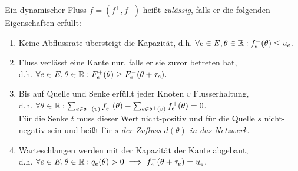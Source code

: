 \begin{definition}
	Ein dynamischer Fluss $f=(f^+, f^-)$ heißt \emph{zulässig}, falls er die folgenden Eigenschaften erfüllt:
	\begin{enumerate}[label=(F\arabic*)]
		\item\label{def-feasible-flow-capacity} Keine Abflussrate übersteigt die Kapazität, d.h. $\forall e\in E, \theta\in\mathbb{R}: f_e^-(\theta)\leq u_e$.
		\item\label{def-feasible-flow-no-negative-flow} Fluss verlässt eine Kante nur, falls er sie zuvor betreten hat,\\ d.h. $\forall e\in E, \theta\in\mathbb{R}: F_e^+(\theta) \geq F_e^-(\theta + \tau_e).$
		\item\label{def-feasible-flow-no-flow-at-node} Bis auf Quelle und Senke erfüllt jeder Knoten $v$ Flusserhaltung,\\
		d.h. $\forall\theta\in\mathbb{R}: \sum_{e\in\delta^-(v)}f^-_e(\theta) - \sum_{e\in\delta^+(v)} f_e^+(\theta) = 0$.\\
		Für die Senke $t$ muss dieser Wert nicht-positiv und für die Quelle $s$ nicht-negativ sein und heißt für $s$ \emph{der Zufluss $d(\theta)$ in das Netzwerk}.
		\item\label{def-feasible-flow-queue-with-capacity} Warteschlangen werden mit der Kapazität der Kante abgebaut,\\ d.h. $\forall e\in E, \theta\in\mathbb{R}: q_e(\theta) > 0 \implies f_e^-(\theta + \tau_e) = u_e$.
	\end{enumerate}
\end{definition}


